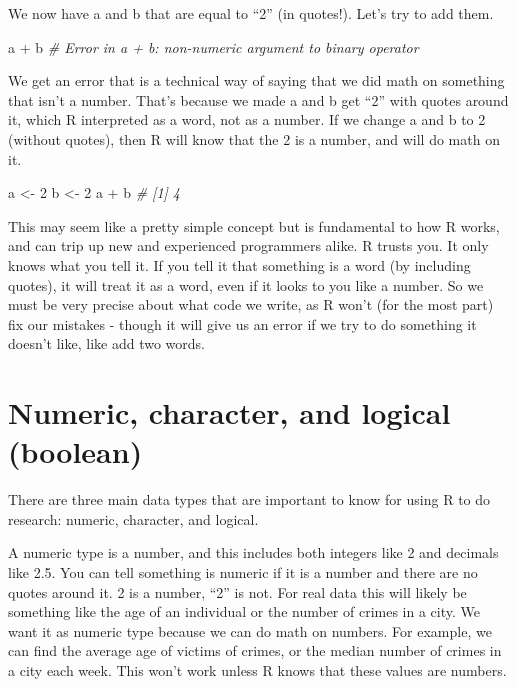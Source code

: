 \documentclass[
  a4paper,
]{krantz}
\makeatletter
\newenvironment{Shaded}{\begin{snugshade}}{\end{snugshade}}
\newcommand{\CommentTok}[1]{\textcolor[rgb]{0.37,0.37,0.37}{\textit{#1}}}
\newcommand{\DecValTok}[1]{\textcolor[rgb]{0.06,0.06,0.06}{#1}}
\newcommand{\NormalTok}[1]{#1}
\newcommand{\OtherTok}[1]{\textcolor[rgb]{0.37,0.37,0.37}{#1}}
\newcommand{\SpecialCharTok}[1]{\textcolor[rgb]{0,0,0}{#1}}
\newenvironment{kframe}{%
\medskip{}
\setlength{\fboxsep}{.8em}
 \def\at@end@of@kframe{}%
 \ifinner\ifhmode%
  \def\at@end@of@kframe{\end{minipage}}%
  \begin{minipage}{\columnwidth}%
 \fi\fi%
 \def\FrameCommand##1{\hskip\@totalleftmargin \hskip-\fboxsep
 \colorbox{shadecolor}{##1}\hskip-\fboxsep
     \hskip-\linewidth \hskip-\@totalleftmargin \hskip\columnwidth}%
 \MakeFramed {\advance\hsize-\width
   \@totalleftmargin\z@ \linewidth\hsize
   \@setminipage}}%
 {\par\unskip\endMakeFramed%
 \at@end@of@kframe}
\renewenvironment{Shaded}{\begin{kframe}}{\end{kframe}}
\makeatother
\begin{document}
We now have a and b that are equal to ``2'' (in quotes!).
Let's try to add them.

\begin{Shaded}
\begin{Highlighting}[]
\NormalTok{a }\SpecialCharTok{+}\NormalTok{ b}
\CommentTok{\# Error in a + b: non{-}numeric argument to binary operator}
\end{Highlighting}
\end{Shaded}

We get an error that is a technical way of saying that we
did math on something that isn't a number. That's because we
made a and b get ``2'' with quotes around it, which R
interpreted as a word, not as a number. If we change a and b
to 2 (without quotes), then R will know that the 2 is a
number, and will do math on it.

\begin{Shaded}
\begin{Highlighting}[]
\NormalTok{a }\OtherTok{\textless{}{-}} \DecValTok{2}
\NormalTok{b }\OtherTok{\textless{}{-}} \DecValTok{2}
\NormalTok{a }\SpecialCharTok{+}\NormalTok{ b}
\CommentTok{\# [1] 4}
\end{Highlighting}
\end{Shaded}

This may seem like a pretty simple concept but is
fundamental to how R works, and can trip up new and
experienced programmers alike. R trusts you. It only knows
what you tell it. If you tell it that something is a word
(by including quotes), it will treat it as a word, even if
it looks to you like a number. So we must be very precise
about what code we write, as R won't (for the most part) fix
our mistakes - though it will give us an error if we try to
do something it doesn't like, like add two words.

\hypertarget{numeric-character-and-logical-boolean}{%
\section{Numeric, character, and logical
(boolean)}\label{numeric-character-and-logical-boolean}}

There are three main data types that are important to know
for using R to do research: numeric, character, and logical.

A numeric type is a number, and this includes both integers
like 2 and decimals like 2.5. You can tell something is
numeric if it is a number and there are no quotes around it.
2 is a number, ``2'' is not. For real data this will likely
be something like the age of an individual or the number of
crimes in a city. We want it as numeric type because we can
do math on numbers. For example, we can find the average age
of victims of crimes, or the median number of crimes in a
city each week. This won't work unless R knows that these
values are numbers.
\end{document}
